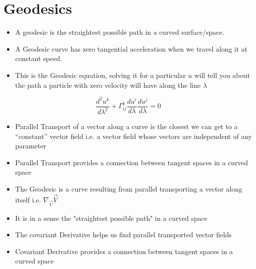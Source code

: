 \section{Geodesics}
\begin{itemize}
\item A geodesic is the straightest possible path in a curved surface/space. 
\item A Geodesic curve has zero tangential acceleration when we travel along it at constant speed.
\item This is the Geodesic equation, solving it for a particular $u$ will tell you about the path a particle with zero velocity will have along the line $\lambda$
\end{itemize}
\begin{equation}
\frac{d^{2} u^{k}}{d \lambda^{2}} + \Gamma^{k}_{ij}\frac{d u^{i}}{d \lambda}\frac{d u^{j}}{d \lambda} = 0
\end{equation}
\begin{itemize}
\item  Parallel Transport of a vector along a curve is the closest we can get to a “constant” vector field i.e. a vector field whose vectors are independent of any parameter
\item Parallel Transport provides a connection between tangent spaces in a curved space
\item The Geodesic is a curve resulting from parallel transporting  a vector along itself i.e. $\nabla_{\vec{V}}\vec{V}$
\item It is in a sense the "straightest possible path" in a curved space
\item The covariant Derivative helps us find parallel transported vector fields
\item Covariant Derivative provides a connection between tangent spaces in a curved space
\end{itemize}
